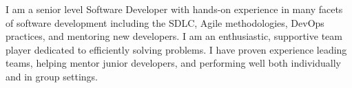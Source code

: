 
\begin{cvparagraph}
I am a senior level Software Developer with hands-on experience in many facets of software development including
the SDLC, Agile methodologies, DevOps practices, and mentoring new developers.
I am an enthusiastic, supportive team player dedicated to efficiently solving problems.
I have proven experience leading teams, helping mentor junior developers, and performing well both individually and in group settings.
\end{cvparagraph}